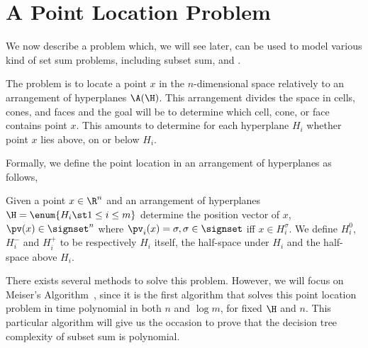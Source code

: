 \section{A Point Location Problem}

We now describe a problem which, we will see later, can be used to model
various kind of set sum problems, including subset sum, \kSUM and \kLDT.

The problem is to locate a point $x$ in the $n$-dimensional space relatively
to an arrangement of hyperplanes $\A(\H)$. This arrangement divides the space
in cells, cones, and faces and the goal will be to determine which
cell, cone, or face contains point $x$. This amounts to determine for each
hyperplane $H_i$ whether point $x$ lies above, on or below $H_i$.

Formally, we define the point location in an arrangement of hyperplanes as
follows,

\begin{problem}
Given a point $x \in \R^n$ and an arrangement of hyperplanes $\H = \enum{ H_i
\st 1 \leq i \leq m }$ determine the position vector of $x$, $\pv(x) \in
\signset^n$ where $\pv_i(x) = \sigma, \sigma \in \signset$ iff $x \in
H_i^{\sigma}$. We define $H_i^{0}$, $H_i^{-}$ and $H_i^{+}$ to be
respectively $H_i$ itself, the half-space under $H_i$ and the half-space above
$H_i$.
\end{problem}

There exists several methods to solve this problem. However, we will focus on
Meiser's Algorithm~\cite{meiser:1993}, since it is the first algorithm that
solves this point location problem in time polynomial in both $n$ and $\log
m$, for fixed $\H$ and $n$. This particular algorithm will give us the
occasion to prove that the decision tree complexity of subset sum is
polynomial.

